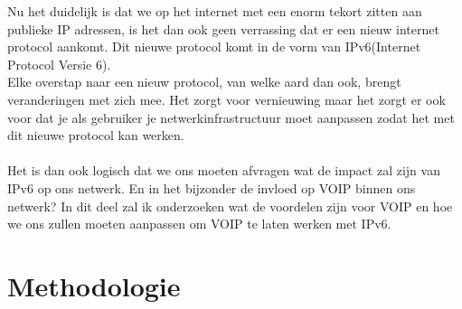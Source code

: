 \documentclass[pdftex,a4paper,12pt,twoside]{report}
\begin{document}
 Nu het duidelijk is dat we op het internet met een enorm tekort zitten aan publieke IP adressen, is het dan ook geen verrassing dat er een nieuw internet protocol aankomt. Dit nieuwe protocol komt in de vorm van IPv6(Internet Protocol Versie 6). \\
Elke overstap naar een nieuw protocol, van welke aard dan ook, brengt veranderingen met zich mee. Het zorgt voor vernieuwing maar het zorgt er ook voor dat je als gebruiker je netwerkinfrastructuur moet aanpassen zodat het met dit nieuwe protocol kan werken. 
\\ \\
Het is dan ook logisch dat we ons moeten afvragen wat de impact zal zijn van IPv6 op ons netwerk. En in het bijzonder de invloed op VOIP binnen ons netwerk? In dit deel zal ik onderzoeken wat de voordelen zijn voor VOIP en hoe we ons zullen moeten aanpassen om VOIP te laten werken met IPv6.
\newpage


\chapter{Methodologie}
\label{ch:methodologie}
\end{document}
